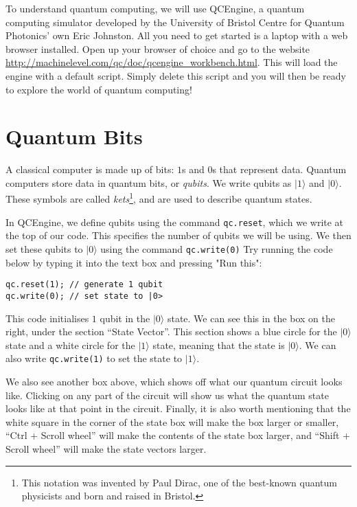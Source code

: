 \documentclass[twocolumn]{article}
\begin{document}
To understand quantum computing, we will use QCEngine, a quantum computing simulator developed by the University of Bristol Centre for Quantum Photonics' own Eric Johnston. All you need to get started is a laptop with a web browser installed. Open up your browser of choice and go to the website \url{http://machinelevel.com/qc/doc/qcengine_workbench.html}. This will load the engine with a default script. Simply delete this script and you will then be ready to explore the world of quantum computing!

\section{Quantum Bits}

A classical computer is made up of bits: $1$s and $0$s that represent data. Quantum computers store data in quantum bits, or {\em qubits}. We write qubits as $|1\rangle$ and $|0\rangle$. These symbols are called {\em kets}\footnote{This notation was invented by Paul Dirac, one of the best-known quantum physicists and born and raised in Bristol.}, and are used to describe quantum states.

In QCEngine, we define qubits using the command \texttt{qc.reset}, which we write at the top of our code. This specifies the number of qubits we will be using. We then set these qubits to $|0\rangle$ using the command \texttt{qc.write(0)} Try running the code below by typing it into the text box and pressing "Run this":

\begin{lstlisting}
qc.reset(1); // generate 1 qubit
qc.write(0); // set state to |0>
\end{lstlisting}

This code initialises $1$ qubit in the $|0\rangle$ state. We can see this in the box on the right, under the section ``State Vector''. This section shows a blue circle for the $|0\rangle$ state and a white circle for the $|1\rangle$ state, meaning that the state is $|0\rangle$. We can also write \texttt{qc.write(1)} to set the state to $|1\rangle$.

We also see another box above, which shows off what our quantum circuit looks like. Clicking on any part of the circuit will show us what the quantum state looks like at that point in the circuit. Finally, it is also worth mentioning that the white square in the corner of the state box will make the box larger or smaller, ``Ctrl + Scroll wheel'' will make the contents of the state box larger, and ``Shift + Scroll wheel'' will make the state vectors larger.
\end{document}
